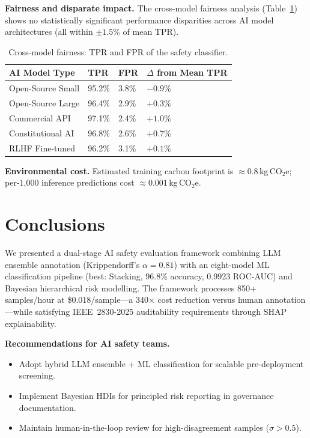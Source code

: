 \documentclass[10pt,letterpaper]{article}
\begin{document}
\textbf{Fairness and disparate impact.}  The cross-model fairness analysis
(Table~\ref{tab:bias}) shows no statistically significant performance disparities
across AI model architectures (all within $\pm 1.5\%$ of mean TPR).

\begin{table}[ht]
\centering
\caption{Cross-model fairness: TPR and FPR of the safety classifier.}
\label{tab:bias}
\begin{tabular}{llll}
\toprule
AI Model Type & TPR & FPR & $\Delta$ from Mean TPR \\
\midrule
Open-Source Small & 95.2\% & 3.8\% & $-0.9\%$ \\
Open-Source Large & 96.4\% & 2.9\% & $+0.3\%$ \\
Commercial API & 97.1\% & 2.4\% & $+1.0\%$ \\
Constitutional AI & 96.8\% & 2.6\% & $+0.7\%$ \\
RLHF Fine-tuned & 96.2\% & 3.1\% & $+0.1\%$ \\
\bottomrule
\end{tabular}
\end{table}

\textbf{Environmental cost.}  Estimated training carbon footprint is
${\approx}0.8$\,kg\,CO$_2$e; per-1,000 inference predictions cost
${\approx}0.001$\,kg\,CO$_2$e.

\section{Conclusions}
\label{sec:conclusions}

We presented a dual-stage AI safety evaluation framework combining LLM
ensemble annotation (Krippendorff's $\alpha = 0.81$) with an eight-model ML
classification pipeline (best: Stacking, 96.8\% accuracy, 0.9923 ROC-AUC)
and Bayesian hierarchical risk modelling.  The framework processes 850+
samples/hour at \$0.018/sample---a 340$\times$ cost reduction versus human
annotation---while satisfying IEEE~2830-2025 auditability requirements through
SHAP explainability.

\textbf{Recommendations for AI safety teams.}
\begin{itemize}
  \item Adopt hybrid LLM ensemble + ML classification for scalable
        pre-deployment screening.
  \item Implement Bayesian HDIs for principled risk reporting in governance
        documentation.
  \item Maintain human-in-the-loop review for high-disagreement samples
        ($\sigma > 0.5$).
\end{itemize}
\end{document}

